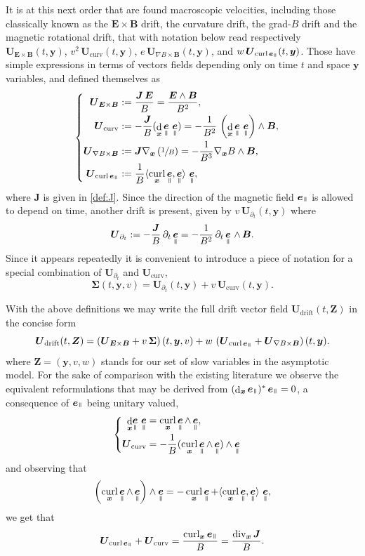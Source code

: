 \documentclass[JEP,XML,SOM,Unicode]{cedram}
\newenvironment{splitcases}
{\begin{cases}\begin{aligned}}
{\end{aligned}\end{cases}}
\let\d\partial
\DeclareMathOperator\dD{d}\let\dd\dD
\DeclareMathOperator{\Div}{div}
\DeclareMathOperator{\Curl}{curl}
\theoremstyle{plain}
\theoremstyle{definition}
\newcommand{\be}{\begin{equation}}
\newcommand{\ee}{\end{equation}}
\newcommand\bB{{\boldsymbol B}}
\newcommand\bE{{\boldsymbol E}}
\newcommand\bJ{{\boldsymbol J}}
\newcommand\bU{{\boldsymbol U}}
\newcommand\bZ{{\boldsymbol Z}}
\newcommand\bfx{{\boldsymbol x}}
\newcommand\bfy{{\boldsymbol y}}
\newcommand\bfZ{{\boldsymbol Z}}
\newcommand\Sig{{\boldsymbol \Sigma}}
\DeclareMathOperator{\beD}{\boldsymbol{e}}
\newcommand\eDpar{\beD_\mypar}
\let\e w
\newcommand{\EcB}{\bU_{\bE\times\bB}}
\newcommand{\gradB}{\bU_{\nabla B\times\bB}}
\newcommand{\curvB}{\bU_{\mathrm{curv}}}
\newcommand{\rotB}{\bU_{\Curl\eDpar}}
\newcommand{\dtB}{\bU_{\d_t}}
\newcommand{\Ud}{\bU_{\mathrm{drift}}}
\newcommand{\mypar}{{\mkern3mu\vphantom{\perp}\vrule depth 0pt\mkern2mu\vrule depth 0pt\mkern3mu}}
\begin{document}
It is at this next order that are found macroscopic velocities, including those classically known as the $\bE\times \bB$ drift, the curvature drift, the grad-$B$ drift and the magnetic rotational drift, that with notation below read respectively $\EcB(t,\bfy)$, $v^2\,
\curvB(t,\bfy)$, $e\,\gradB(t,\bfy)$, and $\e\,\rotB(t,\bfy)$. Those have simple expressions in terms of vectors fields depending only on time $t$ and space $\bfy$ variables, and defined themselves as
\be
\label{drift-0}
\begin{splitcases}
\EcB &:=\frac{\bJ\,\bE}{B}
=\frac{\bE\wedge\bB}{B^2},
\\
 \curvB&:=
-\frac{\bJ}{B}(\dD_{\bfx}\eDpar\,\eDpar)
=-\frac{1}{B^2}\,\left(\dD_{\bfx}\eDpar\,\eDpar\right)\wedge\bB,
\\
\gradB &:=
\bJ\nabla_\bfx\left(\sfrac1B\right)
=-\frac{1}{B^3}
\nabla_\bfx B \wedge \bB,
\\
\rotB&:=\frac{1}{B}\langle\Curl_\bfx \eDpar,\eDpar\rangle\,\eDpar,
\end{splitcases}
\ee
where $\bJ$ is given in \eqref{def:J}. Since the direction of the magnetic field $\eDpar$ is allowed to depend on time, another drift is present, given by $v\, \dtB(t,\bfy)$ where
\be
\dtB:=
-\frac{\bJ}{B}\,\d_t\eDpar
=-\frac{1}{B^2}\,\d_t\eDpar\,\wedge\,\bB.
\label{drift-1}
\ee
Since it appears repeatedly it is convenient to introduce a piece of notation for a special combination of $\dtB$ and $\curvB$,
\be
\Sig(t,\bfy,v) = \dtB(t,\bfy) +v\,\curvB(t,\bfy).
\label{drift-2}
\ee

With the above definitions we may write the full drift vector field $\Ud(t,\bfZ)$ in the concise form
\be
\label{drift-3}
\Ud(t,\bZ) = \left(\EcB+v\,\Sig\right)(t,\bfy,v)+ \e\,\left( \rotB+\gradB\right)(t,\bfy).
\ee
where $\bZ=(\bfy,v,\e)$ stands for our set of slow variables in the
asymptotic model. For the sake of comparison with the existing
literature we observe the equivalent reformulations that may be derived from $(\dD_\bfx\eDpar)^*\eDpar=0$, a consequence of $\eDpar$ being unitary valued,
\[
\begin{splitcases}
\dD_{\bfx}\!\eDpar\,\eDpar&=\Curl_\bfx \eDpar\wedge\eDpar,
\\
\curvB&=-\frac{1}{B}(\Curl_\bfx \eDpar\wedge\eDpar)\wedge\eDpar
\end{splitcases}
\]
and observing that
\[
\left(\Curl_\bfx \eDpar \wedge \eDpar\right)\wedge \eDpar = -\Curl_\bfx\eDpar
+ \langle \Curl_\bfx\eDpar,\eDpar\rangle\,\eDpar,
\]
we get that
\be
\label{formule:utile}
\rotB+\curvB= \frac{\Curl_\bfx \eDpar}{B}=\frac{\Div_\bfx \bJ}{B}.
\ee
\end{document}
